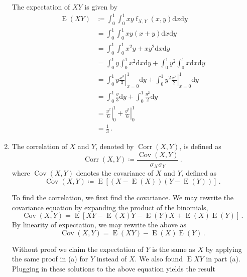 \documentclass[12pt]{fphw}
\newcommand{\expect}{\operatorname{E}}
\newcommand{\corr}{\operatorname{Corr}}
\newcommand{\cov}{\operatorname{Cov}}
\newcommand{\eval}[3]{\left. #1 \right\vert_{#2}^{#3}}
\begin{document}
\begin{enumerate}
	The expectation of $X Y$ is given by
	\begin{align}
		\expect(X Y)
			&\coloneqq \int_{0}^{1} \int_{0}^{1} x y \operatorname{f}_{X,Y}(x,y) \mathrm{d}x \mathrm{d}y\\
			&= \int_{0}^{1} \int_{0}^{1} x y (x+y) \mathrm{d}x \mathrm{d}y\\
			&= \int_{0}^{1} \int_{0}^{1} x^2 y + x y^2 \mathrm{d}x \mathrm{d}y\\
			&= \int_{0}^{1} y \int_{0}^{1} x^2 \mathrm{d}x \mathrm{d}y + \int_{0}^{1} y^2 \int_{0}^{1} x \mathrm{d}x \mathrm{d}y\\			
			&= \int_{0}^{1} y \eval{\frac{x^3}{3}}{x=0}{1} \mathrm{d}y + \int_{0}^{1} y^2 \eval{\frac{x^2}{2}}{x=0}{1} \mathrm{d}y\\	
			&= \int_{0}^{1} \frac{y}{3} \mathrm{d}y + \int_{0}^{1} \frac{y^2}{2} \mathrm{d}y\\				
			&= \eval{\frac{y^2}{6}}{0}{1} + \eval{\frac{y^3}{6}}{0}{1}\\
			&= \frac{1}{3}\,.			
	\end{align}
	
	\item The correlation of $X$ and $Y$, denoted by $\corr(X,Y)$, is defined as
	\begin{equation}
		\corr(X,Y) \coloneqq \frac{\cov(X,Y)}{\sigma_X \sigma_Y}\,.
	\end{equation}
	where $\cov(X,Y)$ denotes the covariance of $X$ and $Y$, defined as
	\begin{equation}
		\cov(X,Y) \coloneqq \expect\left[(X-\expect(X))(Y-\expect(Y))\right]\,.
	\end{equation}
	
	To find the correlation, we first find the covariance.
	We may rewrite the covariance equation by expanding the product of the binomials,
	\begin{equation}
		\cov(X,Y) = \expect\left[X Y -\expect(X) Y - \expect(Y) X + \expect(X) \expect(Y)\right]\,.
	\end{equation}
	By linearity of expectation, we may rewrite the above as
	\begin{equation}
		\cov(X,Y) = \expect(X Y) - \expect(X) \expect(Y)\,.
	\end{equation}
	
	Without proof we claim the expectation of $Y$ is the same as $X$ by applying the same proof in (a) for $Y$ instead of $X$.
	We also found $\expect{X Y}$ in part (a).
	Plugging in these solutions to the above equation yields the result
	

\end{enumerate}
\end{document}
